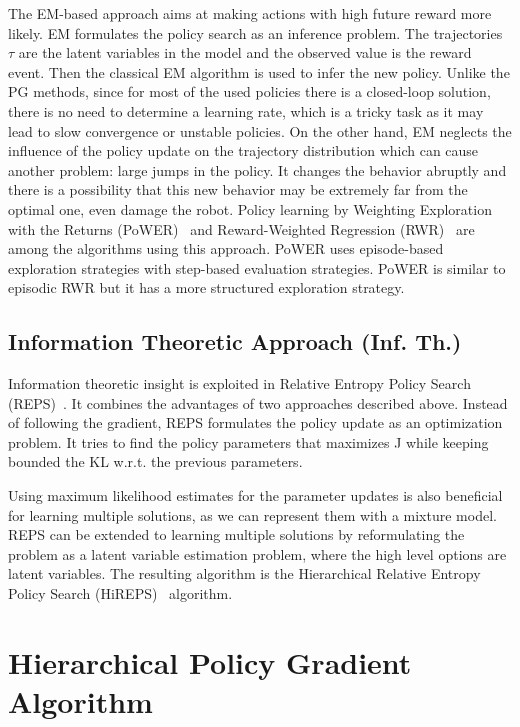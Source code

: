 The EM-based approach aims at making actions with high future reward more likely. EM formulates the policy search as an inference problem. The trajectories $\tau$ are the latent variables in the model and the observed value is the reward event. Then the classical EM algorithm is used to infer the new policy. Unlike the PG methods, since for most of the used policies there is a closed-loop solution, there is no need to determine a learning rate, which is a tricky task as it may lead to slow convergence or unstable policies. On the other hand, EM neglects the influence of the policy update on the trajectory distribution which can cause another problem: large jumps in the policy. It changes the behavior abruptly and there is a possibility that this new behavior may be extremely far from the optimal one, even damage the robot. Policy learning by Weighting Exploration with the Returns (PoWER)~\cite{Kober2008PolicySF} and Reward-Weighted Regression (RWR)~\cite{Peters2007ApplyingTE} are among the algorithms using this approach. PoWER uses episode-based exploration strategies with step-based evaluation strategies. PoWER is similar to episodic RWR but it has a more structured exploration strategy.

\subsection{Information Theoretic Approach (Inf. Th.)}
Information theoretic insight is exploited in Relative Entropy Policy Search (REPS)~\cite{Daniel2012HierarchicalRE, Peters2010RelativeEP}. It combines the advantages of two approaches described above. Instead of following the gradient, REPS formulates the policy update as an optimization problem. It tries to find the policy parameters that maximizes J while keeping bounded the KL w.r.t. the previous parameters. 

Using maximum likelihood estimates for the parameter updates is also beneficial for learning multiple solutions, as we can represent them with a mixture model. REPS can be extended to learning multiple solutions by reformulating the problem as a latent variable estimation problem, where the high level options are latent variables. The resulting algorithm is the Hierarchical Relative Entropy Policy Search (HiREPS)~\cite{Daniel2012HierarchicalRE} algorithm. 


\section{Hierarchical Policy Gradient Algorithm}

